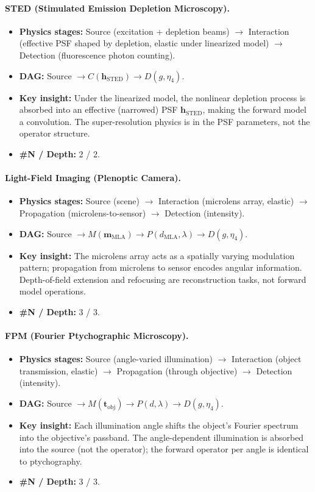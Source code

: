 \paragraph{STED (Stimulated Emission Depletion Microscopy).}
\begin{itemize}
  \item \textbf{Physics stages:} Source (excitation + depletion beams) $\to$ Interaction (effective PSF shaped by depletion, elastic under linearized model) $\to$ Detection (fluorescence photon counting).
  \item \textbf{DAG:} Source $\to C(\mathbf{h}_{\mathrm{STED}}) \to D(g, \eta_4)$.
  \item \textbf{Key insight:} Under the linearized model, the nonlinear depletion process is absorbed into an effective (narrowed) PSF $\mathbf{h}_{\mathrm{STED}}$, making the forward model a convolution. The super-resolution physics is in the PSF parameters, not the operator structure.
  \item \textbf{\#N / Depth:} 2 / 2.
\end{itemize}

\paragraph{Light-Field Imaging (Plenoptic Camera).}
\begin{itemize}
  \item \textbf{Physics stages:} Source (scene) $\to$ Interaction (microlens array, elastic) $\to$ Propagation (microlens-to-sensor) $\to$ Detection (intensity).
  \item \textbf{DAG:} Source $\to M(\mathbf{m}_{\mathrm{MLA}}) \to P(d_{\mathrm{MLA}}, \lambda) \to D(g, \eta_4)$.
  \item \textbf{Key insight:} The microlens array acts as a spatially varying modulation pattern; propagation from microlens to sensor encodes angular information. Depth-of-field extension and refocusing are reconstruction tasks, not forward model operations.
  \item \textbf{\#N / Depth:} 3 / 3.
\end{itemize}

\paragraph{FPM (Fourier Ptychographic Microscopy).}
\begin{itemize}
  \item \textbf{Physics stages:} Source (angle-varied illumination) $\to$ Interaction (object transmission, elastic) $\to$ Propagation (through objective) $\to$ Detection (intensity).
  \item \textbf{DAG:} Source $\to M(\mathbf{t}_{\mathrm{obj}}) \to P(d, \lambda) \to D(g, \eta_4)$.
  \item \textbf{Key insight:} Each illumination angle shifts the object's Fourier spectrum into the objective's passband. The angle-dependent illumination is absorbed into the source (not the operator); the forward operator per angle is identical to ptychography.
  \item \textbf{\#N / Depth:} 3 / 3.
\end{itemize}


